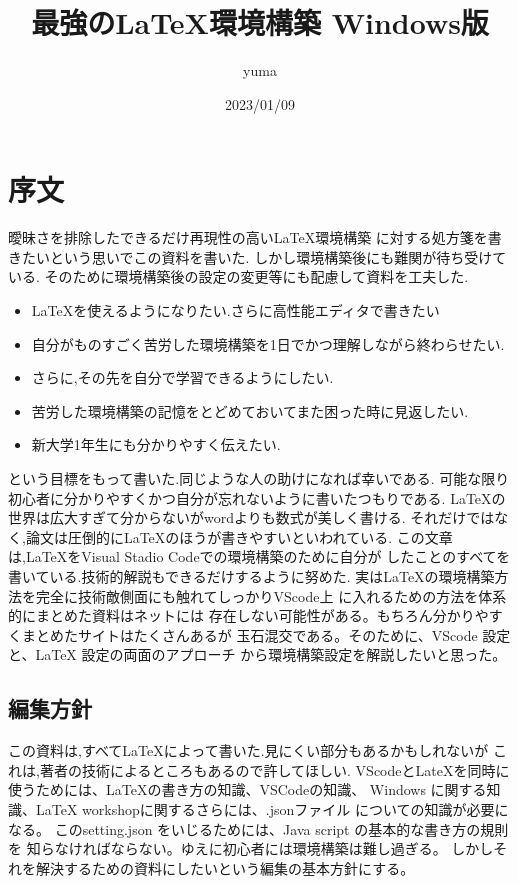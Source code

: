 \documentclass{ltjsarticle}
\begin{document}
\title{最強の\LaTeX 環境構築 Windows版}
\author{yuma}
\date{2023/01/09}
\maketitle
\section{序文}
曖昧さを排除したできるだけ再現性の高い\LaTeX 環境構築
に対する処方箋を書きたいという思いでこの資料を書いた.
しかし環境構築後にも難関が待ち受けている.
そのために環境構築後の設定の変更等にも配慮して資料を工夫した.
\begin{itemize}
  \item \LaTeX を使えるようになりたい.さらに高性能エディタで書きたい
  \item 自分がものすごく苦労した環境構築を1日でかつ理解しながら終わらせたい.
  \item さらに,その先を自分で学習できるようにしたい.
  \item 苦労した環境構築の記憶をとどめておいてまた困った時に見返したい.
  \item 新大学1年生にも分かりやすく伝えたい.
\end{itemize}
という目標をもって書いた.同じような人の助けになれば幸いである.
可能な限り初心者に分かりやすくかつ自分が忘れないように書いたつもりである.
\LaTeX の世界は広大すぎて分からないがwordよりも数式が美しく書ける.
それだけではなく,論文は圧倒的に\LaTeX のほうが書きやすいといわれている.
この文章は,\LaTeX をVisual Stadio Codeでの環境構築のために自分が
したことのすべてを書いている.技術的解説もできるだけするように努めた.
実は\LaTeX の環境構築方法を完全に技術敵側面にも触れてしっかりVScode上
に入れるための方法を体系的にまとめた資料はネットには
存在しない可能性がある。もちろん分かりやすくまとめたサイトはたくさんあるが
玉石混交である。そのために、VScode 設定と、LaTeX 設定の両面のアプローチ
から環境構築設定を解説したいと思った。


\subsection*{編集方針}

この資料は,すべて\LaTeX によって書いた.見にくい部分もあるかもしれないが
これは,著者の技術によるところもあるので許してほしい.
VScodeとLateXを同時に使うためには、LaTeXの書き方の知識、VSCodeの知識、
Windows に関する知識、LaTeX workshopに関するさらには、.jsonファイル
についての知識が必要になる。
このsetting.json をいじるためには、Java script の基本的な書き方の規則を
知らなければならない。ゆえに初心者には環境構築は難し過ぎる。
しかしそれを解決するための資料にしたいという編集の基本方針にする。
\end{document}
